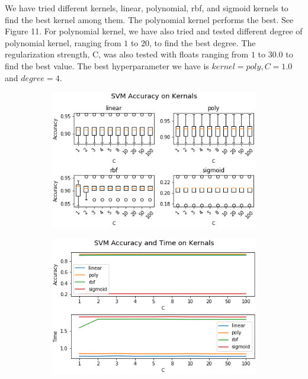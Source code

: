 \documentclass[11.5pt]{article}
\begin{document}
\begin{enumerate}
\begin{itemize}
\begin{enumerate}
                We have tried different kernels, linear, polynomial, rbf, and sigmoid kernels to find the best kernel among them.
                The polynomial kernel performs the best.
                See Figure 11.
                For polynomial kernel, we have also tried and tested different degree of polynomial kernel, ranging from $1$ to $20$, to find the best degree.
                The regularization strength, C, was also tested with floats ranging from $1$ to $30.0$ to find the best value.
                The best hyperparameter we have is $kernel = poly, C = 1.0$ and $degree = 4$.
                \begin{figure}[h!]
                    \begin{subfigure}[b]{0.5\linewidth}
                        \centering
                        \includegraphics[width=\linewidth]{images/res_tradi_SVM_penalty.png}
                    \end{subfigure}
                    \begin{subfigure}[b]{0.5\linewidth}
                        \centering
                        \includegraphics[width=\linewidth]{images/res_tradi_SVM_penalty2.png}

\end{subfigure}
\end{figure}
\end{enumerate}
\end{itemize}
\end{enumerate}
\end{document}
